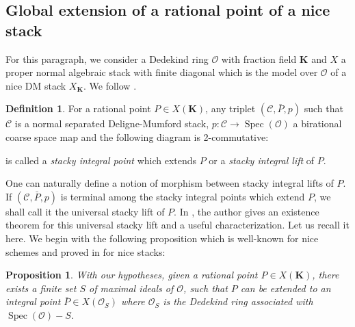 \documentclass{proc-l}
\newcommand{\K}{\mathbf{K}}
\DeclareMathOperator{\Spec}{Spec}
\newcommand{\sheafO}{\mathcal{O}}
\newtheorem{prop}[theorem]{Proposition}
\theoremstyle{definition}
\newtheorem{definition}[theorem]{Definition}
\theoremstyle{remark}
\numberwithin{equation}{section}
\begin{document}
\subsection{Global extension of a rational point of a nice stack}

For this paragraph, we consider a Dedekind ring $\sheafO$ with fraction field $\K$ and $X$ a proper normal algebraic stack with finite diagonal which is the model over $\sheafO$ of a nice DM stack $X_{\K}$. We follow \cite[section 2.1]{ellenberg2022heights}.

\begin{definition}
For a rational point $P \in X(\K)$, any triplet $(\mathcal{C},\bar{P},p)$ such that $\mathcal{C}$ is a normal separated Deligne-Mumford stack, $p : \mathcal{C} \rightarrow \Spec(\sheafO)$ a birational coarse space map and the following diagram is 2-commutative:
\begin{center}
\end{center}is called a \emph{stacky integral point} which extends $P$ or a \emph{stacky integral lift} of $P$.
\end{definition}

One can naturally define a notion of morphism between stacky integral lifts of $P$. If $(\mathcal{C},\bar{P},p)$ is terminal among the stacky integral points which extend $P$, we shall call it the universal stacky lift of $P$. In \cite[section 2.1]{ellenberg2022heights}, the author gives an existence theorem for this universal stacky lift and a useful characterization. Let us recall it here. We begin with the following proposition which is well-known for nice schemes and proved in \cite[proposition B.1]{Rydh_2015} for nice stacks:

\begin{prop}
   With our hypotheses, given a rational point $P \in X(\K)$, there exists a finite set $S$ of maximal ideals of $\sheafO$, such that $P$ can be extended to an integral point $\bar{P} \in X(\sheafO_{S})$ where $\sheafO_S$ is the Dedekind ring associated with $\Spec(\sheafO) - S$.
\end{prop}
\end{document}
